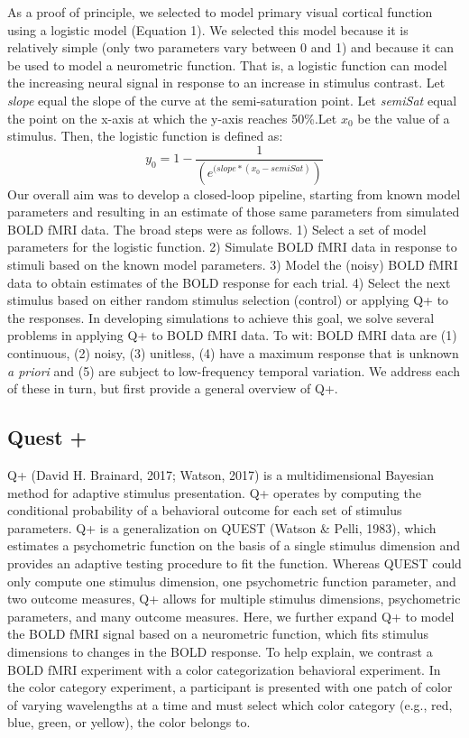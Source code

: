\documentclass[
  man,floatsintext]{apa6}
\begin{document}
As a proof of principle, we selected to model primary visual cortical function using a logistic model (Equation 1). We selected this model because it is relatively simple (only two parameters vary between 0 and 1) and because it can be used to model a neurometric function. That is, a logistic function can model the increasing neural signal in response to an increase in stimulus contrast. Let \emph{slope} equal the slope of the curve at the semi-saturation point. Let \emph{semiSat} equal the point on the x-axis at which the y-axis reaches 50\%.Let \(x_0\) be the value of a stimulus. Then, the logistic function is defined as:
\begin{equation}
  y_0 = 1-\frac{1}{(e^{(slope*(x_0-semiSat)})}
  \end{equation}
Our overall aim was to develop a closed-loop pipeline, starting from known model parameters and resulting in an estimate of those same parameters from simulated BOLD fMRI data. The broad steps were as follows. 1) Select a set of model parameters for the logistic function. 2) Simulate BOLD fMRI data in response to stimuli based on the known model parameters. 3) Model the (noisy) BOLD fMRI data to obtain estimates of the BOLD response for each trial. 4) Select the next stimulus based on either random stimulus selection (control) or applying Q+ to the responses.
In developing simulations to achieve this goal, we solve several problems in applying Q+ to BOLD fMRI data. To wit: BOLD fMRI data are (1) continuous, (2) noisy, (3) unitless, (4) have a maximum response that is unknown \emph{a priori} and (5) are subject to low-frequency temporal variation. We address each of these in turn, but first provide a general overview of Q+.

\hypertarget{quest}{%
\subsection{Quest +}\label{quest}}

Q+ (David H. Brainard, 2017; Watson, 2017) is a multidimensional Bayesian method for adaptive stimulus presentation. Q+ operates by computing the conditional probability of a behavioral outcome for each set of stimulus parameters. Q+ is a generalization on QUEST (Watson \& Pelli, 1983), which estimates a psychometric function on the basis of a single stimulus dimension and provides an adaptive testing procedure to fit the function. Whereas QUEST could only compute one stimulus dimension, one psychometric function parameter, and two outcome measures, Q+ allows for multiple stimulus dimensions, psychometric parameters, and many outcome measures. Here, we further expand Q+ to model the BOLD fMRI signal based on a neurometric function, which fits stimulus dimensions to changes in the BOLD response. To help explain, we contrast a BOLD fMRI experiment with a color categorization behavioral experiment. In the color category experiment, a participant is presented with one patch of color of varying wavelengths at a time and must select which color category (e.g., red, blue, green, or yellow), the color belongs to.
\end{document}
